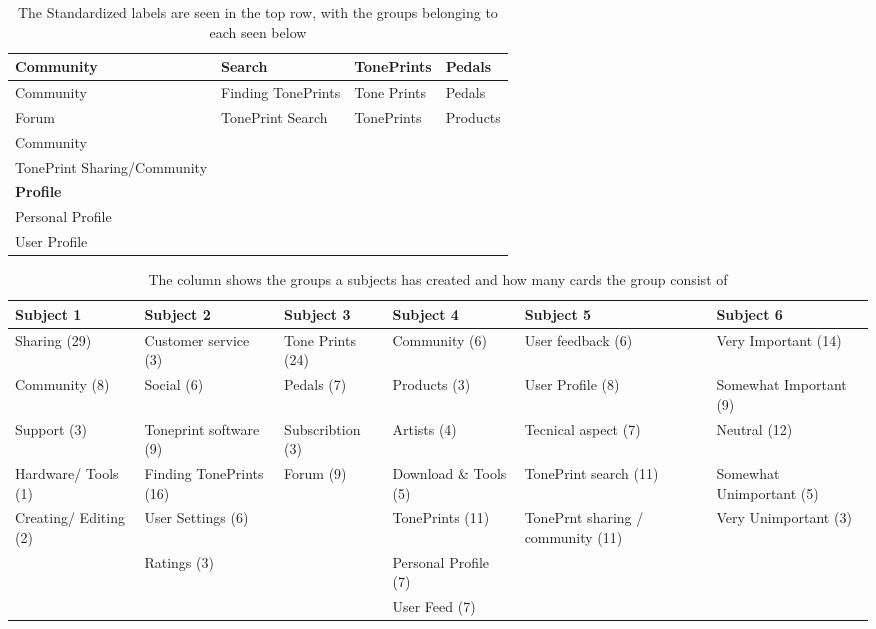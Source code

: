 \begin{table}[H]
\begin{tabular}{|l|l|l|l|}
\hline
\textbf{Community} & \textbf{Search} & \textbf{TonePrints} & \textbf{Pedals} \\ \hline
Community & Finding TonePrints & Tone Prints & Pedals \\
Forum & TonePrint Search & TonePrints & Products \\
Community & & & \\
TonePrint Sharing/Community & & & \\ \hline
\textbf{Profile} & & & \\ \hline
Personal Profile & & & \\
User Profile & & & \\ \hline
\end{tabular}
\caption{The Standardized labels are seen in the top row, with the groups belonging to each seen below}
\label{StandardizedLabels}
\end{table}

\begin{table}[h]
\small
\begin{tabularx}{\textwidth}{|R|R|R|R|R|R|}
\hline
\textbf{Subject 1} & \textbf{Subject 2} & \textbf{Subject 3} & \textbf{Subject 4} & \textbf{Subject 5} & \textbf{Subject 6} \\ \hline
Sharing (29) & Customer service (3) & Tone Prints (24) & Community (6) & User feedback (6) & Very Important (14) \\ \hline
Community (8) & Social (6) & Pedals (7) & Products (3) & User Profile (8) & Somewhat Important (9) \\ \hline
Support (3) & Toneprint software (9) & Subscribtion (3) & Artists (4) & Tecnical aspect (7) & Neutral (12) \\ \hline
Hardware/ Tools (1) & Finding TonePrints (16) & Forum (9) & Download \& Tools (5) & TonePrint search (11) & Somewhat Unimportant (5) \\ \hline
Creating/ Editing (2) & User Settings (6) && TonePrints (11) & TonePrnt sharing / community (11) & Very Unimportant (3) \\ \hline
& Ratings (3) && Personal Profile (7) && \\ \hline
&&& User Feed (7) && \\ \hline
\end{tabularx}
\caption{The column shows the groups a subjects has created and how many cards the group consist of}
\label{Tab:GroupOverview}
\end{table}


